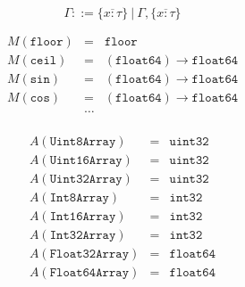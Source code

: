 \documentclass{article}
\newcommand{\funty}[2]{({#1}) \rightarrow {#2}}
\newcommand{\seq}[1]{\overline{{#1}}}
\newcommand{\ok}{\mathrm{\mathbf{ok}}}
\newcommand{\fjudge}[3]{{#1};{#2} \vdash {#3}\ \ok}
\newcommand{\uintfour}{\mathtt{uint32}}
\newcommand{\intfour}{\mathtt{int32}}
\newcommand{\double}{\mathtt{float64}}
\newcommand{\floor}{\mathtt{floor}}
\begin{document}
\[
\Gamma ::= \{ \seq{x : \tau} \} ~|~ \Gamma, \{ \seq{x : \tau} \}
\]

\[
\begin{array}{rcl}
M(\floor) & = & \floor \\
M(\mathtt{ceil}) & = & \funty{\double}{\double} \\
M(\mathtt{sin}) & = & \funty{\double}{\double} \\
M(\mathtt{cos}) & = & \funty{\double}{\double} \\
& \ldots \\
\end{array}
\]

\[
\begin{array}{rcl}
A(\mathtt{Uint8Array}) & = & \uintfour \\
A(\mathtt{Uint16Array}) & = & \uintfour \\
A(\mathtt{Uint32Array}) & = & \uintfour \\
A(\mathtt{Int8Array}) & = & \intfour \\
A(\mathtt{Int16Array}) & = & \intfour \\
A(\mathtt{Int32Array}) & = & \intfour \\
A(\mathtt{Float32Array}) & = & \double \\
A(\mathtt{Float64Array}) & = & \double \\
\end{array}
\]

\newcommand{\Pjudge}[1]{\vdash {#1}\ \ok}
\newcommand{\impjudge}[4]{{#1};{#2};{#3} \vdash {#4}\ \ok}
\newcommand{\fnjudge}[2]{{#1} \vdash {#2}\ \ok}
\newcommand{\expjudge}[2]{{#1} \vdash {#2}\ \ok}
\newcommand{\stmtjudge}[5]{{#1};{#2} \vdash {#3} : {#4} / {#5}}
\newcommand{\exprjudge}[3]{{#1} \vdash {#2} : {#3}}
\newcommand{\notexprjudge}[3]{{#1} \not\vdash {#2} : {#3}}
\newcommand{\casejudge}[6]{{#1};{#2} \vdash {#3} : {#4}, {#5} / {#6}}
\end{document}
